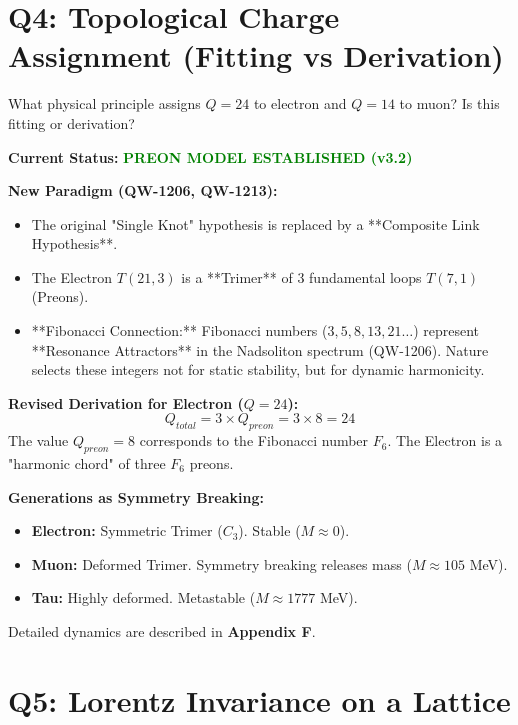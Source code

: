 \documentclass[11pt, a4paper]{article}
\theoremstyle{remark}
\begin{document}
\hrulefill

\section{Q4: Topological Charge Assignment (Fitting vs Derivation)}

\begin{question}
What physical principle assigns $Q=24$ to electron and $Q=14$ to muon? Is this fitting or derivation?
\end{question}

\textbf{Current Status:} \textcolor{green}{\textbf{PREON MODEL ESTABLISHED (v3.2)}}

\textbf{New Paradigm (QW-1206, QW-1213):}
\begin{itemize}
    \item The original "Single Knot" hypothesis is replaced by a **Composite Link Hypothesis**.
    \item The Electron $T(21,3)$ is a **Trimer** of 3 fundamental loops $T(7,1)$ (Preons).
    \item **Fibonacci Connection:** Fibonacci numbers ($3, 5, 8, 13, 21 \dots$) represent **Resonance Attractors** in the Nadsoliton spectrum (QW-1206). Nature selects these integers not for static stability, but for dynamic harmonicity.
\end{itemize}

\textbf{Revised Derivation for Electron ($Q = 24$):}
\begin{equation}
Q_{total} = 3 \times Q_{preon} = 3 \times 8 = 24
\end{equation}
The value $Q_{preon}=8$ corresponds to the Fibonacci number $F_6$. The Electron is a "harmonic chord" of three $F_6$ preons.

\textbf{Generations as Symmetry Breaking:}
\begin{itemize}
    \item \textbf{Electron:} Symmetric Trimer ($C_3$). Stable ($M \approx 0$).
    \item \textbf{Muon:} Deformed Trimer. Symmetry breaking releases mass ($M \approx 105$ MeV).
    \item \textbf{Tau:} Highly deformed. Metastable ($M \approx 1777$ MeV).
\end{itemize}
Detailed dynamics are described in \textbf{Appendix F}.
\hrulefill

\section{Q5: Lorentz Invariance on a Lattice}
\end{document}
